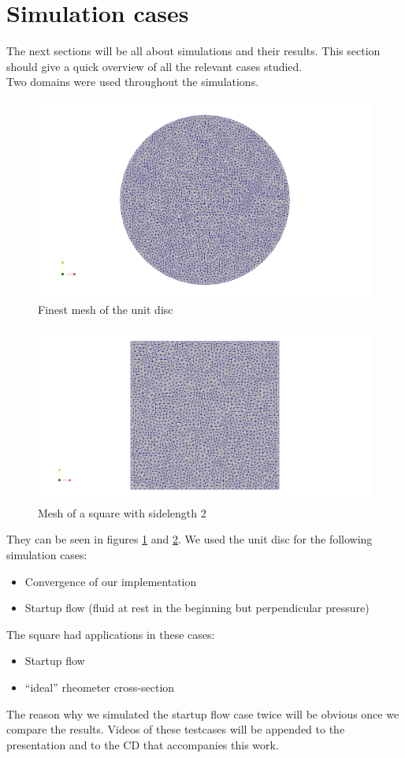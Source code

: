 \documentclass[12pt,a4paper,twoside, open=right]{scrreprt}
\theoremstyle{definition}
\theoremstyle{plain}
\begin{document}
\section{Simulation cases}
The next sections will be all about simulations and their results. This section should give a quick overview of all the relevant cases studied. \\
Two domains were used throughout the simulations. 
\begin{figure}
    \includegraphics[width=\textwidth]{meshcircle}
    \caption{Finest mesh of the unit disc}
    \label{fig:mesh}
\end{figure}
\begin{figure}
    \includegraphics[width=\textwidth]{meshsquare}
    \caption{Mesh of a square with sidelength 2}
    \label{fig:meshsquare}
\end{figure}
They can be seen in figures \ref{fig:mesh} and \ref{fig:meshsquare}.
We used the unit disc for the following simulation cases:
\begin{itemize}
    \item Convergence of our implementation
    \item Startup flow (fluid at rest in the beginning but perpendicular pressure)
\end{itemize}
The square had applications in these cases:
\begin{itemize}
    \item Startup flow
    \item \enquote{ideal} rheometer cross-section
\end{itemize}
The reason why we simulated the startup flow case twice will be obvious once we compare the results. Videos of these testcases will be appended to the presentation and to the CD that accompanies this work.
\end{document}
